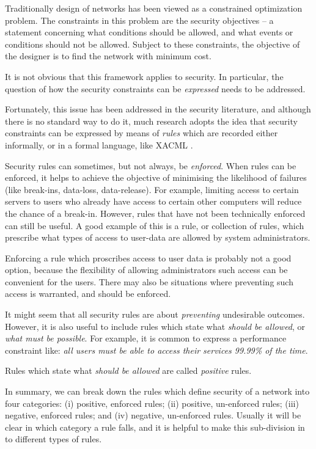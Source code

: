 Traditionally design of networks has been viewed as a constrained optimization problem.
The constraints in this problem are the security objectives -- a statement concerning
what conditions should be allowed, and what events or conditions should not be allowed.
Subject to these constraints, the objective of the designer is to find the network
with minimum cost.

It is not obvious that this framework applies to security. In particular, the question of how the security constraints can be {\em expressed} needs to be addressed. 

Fortunately, this issue has been addressed in the security literature, and although there is no standard way to do it, much research adopts the idea that security constraints can be expressed by means of {\em rules} which are recorded either informally, or in a formal language, like XACML \cite{xacml10}.

Security rules can sometimes, but not always, be {\em enforced}. When rules can be enforced, it helps to achieve the objective of minimising the likelihood of failures (like break-ins, data-loss, data-release). For example, limiting access to certain servers to users who already have access to certain other computers will reduce the chance of a break-in. However, rules that have not been technically enforced can still be useful. A good example of this is a rule, or collection of rules, which prescribe what types of access to user-data are allowed by system administrators.

Enforcing a rule which proscribes access to user data is probably not a good option, because the flexibility of allowing administrators such access can be convenient for the users. There may also be situations where preventing such access is warranted, and should be enforced.

It might seem that all security rules are about {\em preventing} undesirable outcomes. However, it is also useful to include rules which state what {\em should be allowed}, or {\em what must be possible}. For example, it is common to express a performance constraint like: {\em all users must be able to access their services 99.99\% of the time}.

Rules which state what {\em should be allowed} are called {\em positive} rules.

In summary, we can break down the rules which define security of a network into four categories:
(i) positive, enforced rules; (ii) positive, un-enforced rules; (iii) negative, enforced rules;
and (iv) negative, un-enforced rules. Usually it will be clear in which category a rule falls,
and it is helpful to make this sub-division in to different types of rules.

